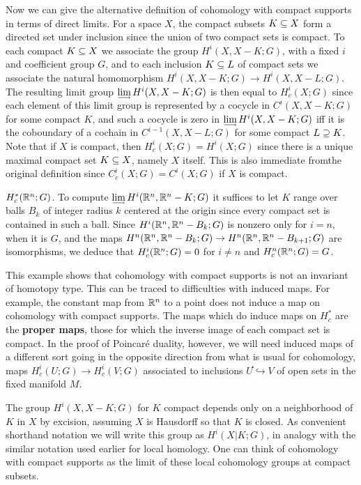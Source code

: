 Now we can give the alternative definition of cohomology with compact supports
in terms of direct limits. For a space $X$, the compact subsets $K\subseteq X$ form a directed set under inclusion since the union of two compact sets is compact. To each compact $K\subseteq X$ we associate the group $H^i(X,X-K;G)$, with a fixed $i$ and coefficient group $G$, and to each inclusion $K\subseteq L$ of compact sets we associate the natural homomorphism $H^i(X,X-K;G)\to H^i(X,X-L;G)$. The resulting limit group $\rlim H^i(X,X-K;G)$ is then equal to $H^i_c(X;G)$ since each element of this limit group is represented by a cocycle in $C^i(X,X-K;G)$ for some compact $K$, and such a cocycle is zero in $\rlim H^i(X,X-K;G)$ iff it is the coboundary of a cochain in $C^{i-1}(X,X-L;G)$ for some compact $L\supseteq K$. Note that if $X$ is compact, then $H^i_c(X;G)=H^i(X;G)$ since there is a unique maximal compact set $K\subseteq X$, namely $X$ itself. This is also immediate fromthe original definition since $C^i_c(X;G)=C^i(X;G)$ if $X$ is compact.
\begin{example}
$H^*_c(\mathbb{R}^n;G)$. To compute $\rlim H^i(\R^n,\R^n-K;G)$ it suffices to let $K$ range over balls $B_k$ of integer radius $k$ centered at the origin since every compact set is contained in such a ball. Since $H^i(\mathbb{R}^n,\mathbb{R}^n-B_k;G)$ is nonzero only for $i=n$, when it is $G$, and the maps $H^n(\mathbb{R}^n,\mathbb{R}^n-B_k;G)\to H^n(\mathbb{R}^n,\mathbb{R}^n-B_{k+1};G)$ are isomorphisms, we deduce that $H^i_c(\mathbb{R}^n;G)=0$ for $i\neq n$ and $H^n_c(\mathbb{R}^n;G)=G$.
\end{example}
This example shows that cohomology with compact supports is not an invariant of homotopy type. This can be traced to difficulties with induced maps. For example, the constant map from $\mathbb{R}^n$ to a point does not induce a map on cohomology with compact supports. The maps which do induce maps on $H^*_c$ are the \textbf{proper maps}, those for which the inverse image of each compact set is compact. In the proof of Poincar\'e duality, however, we will need induced maps of a different sort going in the opposite direction from what is usual for cohomology, maps $H^i_c(U;G)\to H^i_c(V;G)$ associated to inclusions $U֓\hookrightarrow V$ of open sets in the fixed manifold $M$.\par
The group $H^i(X,X-K;G)$ for $K$ compact depends only on a neighborhood of $K$ in $X$ by excision, assuming $X$ is Hausdorff so that $K$ is closed. As convenient shorthand notation we will write this group as $H^i(X|K;G)$, in analogy with the similar notation used earlier for local homology. One can think of cohomology with compact supports as the limit of these local cohomology groups at compact subsets.

